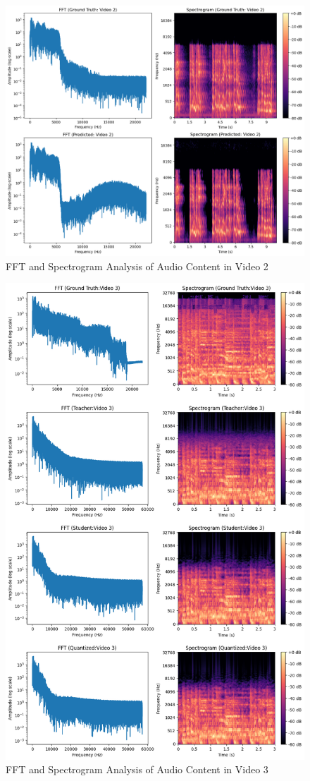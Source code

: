 \documentclass{ioereport}
\begin{document}
\begin{figure}[H]
    \centering
    \includegraphics[width=0.8\linewidth]{assets/audio_video_analysis/Video_2_analysis.png}
    \caption{FFT and Spectrogram Analysis of Audio Content in Video 2}
    \label{fig:fft-spec-v2}
\end{figure}

\begin{figure}[H]
    \centering
    \includegraphics[width=0.7\linewidth]{assets/quantization/fft_spectrogram_Video3.png}
    \caption{FFT and Spectrogram Analysis of Audio Content in Video 3}
    \label{fig:fft-spec-v3}
\end{figure}
\end{document}
